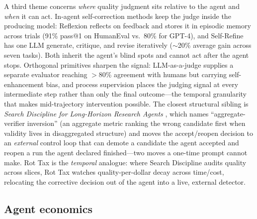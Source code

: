 \documentclass[11pt]{article}
\begin{document}
A third theme concerns \emph{where} quality judgment sits relative to the
agent and \emph{when} it can act. In-agent self-correction methods keep the
judge inside the producing model: Reflexion \cite{shinn2023reflexion} reflects
on feedback and stores it in episodic memory across trials (91\% pass@1 on
HumanEval vs.\ 80\% for GPT-4), and Self-Refine \cite{madaan2023selfrefine}
has one LLM generate, critique, and revise iteratively ($\sim$20\% average
gain across seven tasks). Both inherit the agent's blind spots and cannot act
after the agent stops. Orthogonal primitives sharpen the signal:
LLM-as-a-judge \cite{zheng2023judge} supplies a separate evaluator reaching
$>$80\% agreement with humans but carrying self-enhancement bias, and process
supervision \cite{lightman2023verify} places the judging signal at every
intermediate step rather than only the final outcome---the temporal
granularity that makes mid-trajectory intervention possible. The closest
structural sibling is \emph{Search Discipline for Long-Horizon Research Agents}
\cite{srinivasan2026searchdiscipline}, which names ``aggregate-verifier
inversion'' (an aggregate metric ranking the wrong candidate first when
validity lives in disaggregated structure) and moves the accept/reopen
decision to an \emph{external} control loop that can demote a candidate the
agent accepted and reopen a run the agent declared finished---two moves a
one-time prompt cannot make. Rot Tax is the \emph{temporal} analogue: where
Search Discipline audits quality across slices, Rot Tax watches
quality-per-dollar decay across time/cost, relocating the corrective decision
out of the agent into a live, external detector.

\subsection{Agent economics}
\label{sec:rw-economics}
\end{document}
